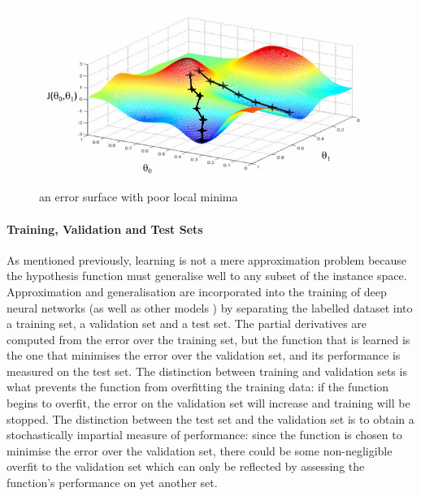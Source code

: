 \documentclass[a4paper,11pt]{article}
\begin{document}
\begin{figure}[h!]
	\centering
	\includegraphics[scale=0.8]{images/local_minima.png}
	\caption{an error surface with poor local minima}
\end{figure}



\paragraph{Training, Validation and Test Sets}

As mentioned previously, learning is not a mere approximation problem because the hypothesis function must generalise well to any subset of the instance space. Approximation and generalisation are incorporated into the training of deep neural networks (as well as other models \cite{train&test}) by separating the labelled dataset into a training set, a validation set and a test set. The partial derivatives are computed from the error over the training set, but the function that is learned is the one that minimises the error over the validation set, and its performance is measured on the test set. The distinction between training and validation sets is what prevents the function from overfitting the training data: if the function begins to overfit, the error on the validation set will increase and training will be stopped. The distinction between the test set and the validation set is to obtain a stochastically impartial measure of performance: since the function is chosen to minimise the error over the validation set, there could be some non-negligible overfit to the validation set which can only be reflected by assessing the function's performance on yet another set.
\end{document}
